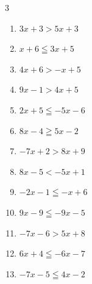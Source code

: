 \begin{multicols}{3}
\begin{enumerate}

  \item $3x+3>5x+3$

        \phantom{$\displaystyle x<0$}

  \item $x+6\leqq 3x+5$


  \item $4x+6>-x+5$


  \item $9x-1>4x+5$


  \item $2x+5\leqq -5x-6$


\columnbreak %

  \item $8x-4\geqq 5x-2$


  \item $-7x+2>8x+9$


  \item $8x-5<-5x+1$


  \item $-2x-1\leqq -x+6$

        \phantom{$\displaystyle x\geqq -7$}

  \item $9x-9\leqq -9x-5$


  \item $-7x-6>5x+8$


  \item $6x+4\leqq -6x-7$


  \item $-7x-5\leqq 4x-2$



\end{enumerate}
\end{multicols}
